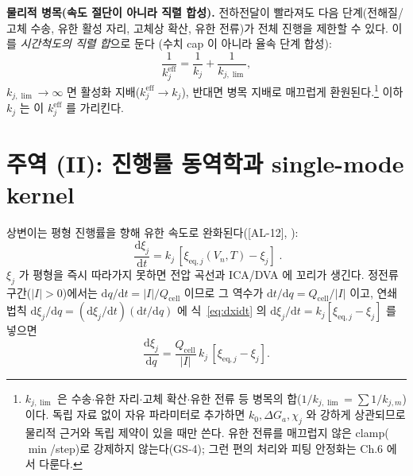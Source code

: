 \documentclass[11pt,a4paper]{article}
\newcommand{\dd}{\mathrm{d}}
\newcommand{\eff}{\mathrm{eff}}
\newcommand{\eq}{\mathrm{eq}}
\newcommand{\cell}{\mathrm{cell}}
\newcommand{\AL}[1]{\textsf{[AL-#1]}}
\begin{document}
\textbf{물리적 병목(속도 절단이 아니라 직렬 합성).} 전하전달이 빨라져도 다음 단계(전해질/고체 수송, 유한
활성 자리, 고체상 확산, 유한 전류)가 전체 진행을 제한할 수 있다. 이를 \emph{시간척도의 직렬 합}으로 둔다
(수치 cap 이 아니라 율속 단계 합성):
\begin{equation}
\frac{1}{k_j^{\eff}}=\frac{1}{k_j}+\frac{1}{k_{j,\lim}},
\label{eq:kphys}
\end{equation}
$k_{j,\lim}\to\infty$ 면 활성화 지배($k_j^{\eff}\to k_j$), 반대면 병목 지배로 매끄럽게 환원된다.\footnote{%
$k_{j,\lim}$ 은 수송$\cdot$유한 자리$\cdot$고체 확산$\cdot$유한 전류 등 병목의 합($1/k_{j,\lim}=\sum 1/k_{j,m}$)
이다. 독립 자료 없이 자유 파라미터로 추가하면 $k_0,\Delta G_a,\chi_j$ 와 강하게 상관되므로 물리적 근거와
독립 제약이 있을 때만 쓴다. 유한 전류를 매끄럽지 않은 clamp($\min$/step)로 강제하지 않는다(GS-4); 그런
편의 처리와 피팅 안정화는 Ch.6 에서 다룬다.} 이하 $k_j$ 는 이 $k_j^{\eff}$ 를 가리킨다.

\section{주역 (II): 진행률 동역학과 single-mode kernel}\label{sec:dyn}
상변이는 평형 진행률을 향해 유한 속도로 완화된다(\AL{12}, \cite{onsager1931,degrootmazur1962}):
\begin{equation}
\boxed{\;\frac{\dd\xi_j}{\dd t}=k_j\,[\xi_{\eq,j}(V_n,T)-\xi_j]\;.}
\label{eq:dxidt}
\end{equation}
$\xi_j$ 가 평형을 즉시 따라가지 못하면 전압 곡선과 ICA/DVA 에 꼬리가 생긴다. 정전류 구간($|I|>0$)에서는
$\dd q/\dd t=|I|/Q_\cell$ 이므로 그 역수가 $\dd t/\dd q=Q_\cell/|I|$ 이고, 연쇄법칙
$\dd\xi_j/\dd q=(\dd\xi_j/\dd t)(\dd t/\dd q)$ 에 식~\eqref{eq:dxidt} 의 $\dd\xi_j/\dd t=k_j[\xi_{\eq,j}-\xi_j]$
를 넣으면
\begin{equation}
\frac{\dd\xi_j}{\dd q}=\frac{Q_\cell}{|I|}\,k_j\,[\xi_{\eq,j}-\xi_j].
\label{eq:dxidq}
\end{equation}
\end{document}
